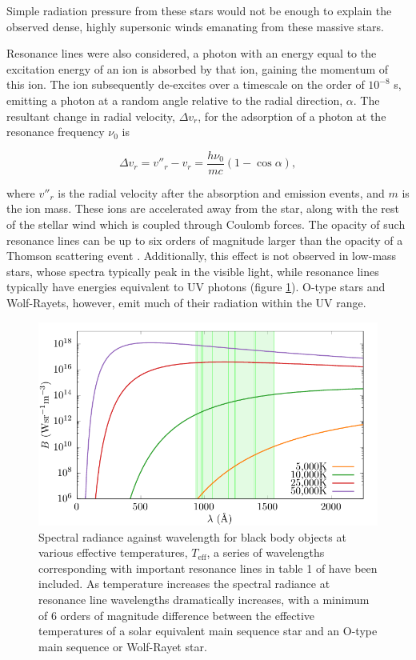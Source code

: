 Simple radiation pressure from these stars would not be enough to explain the observed dense, highly supersonic winds emanating from these massive stars.


Resonance lines were also considered, a photon with an energy equal to the excitation energy of an ion is absorbed by that ion, gaining the momentum of this ion.
The ion subsequently de-excites over a timescale on the order of $10^{-8}$ \si{\second}, emitting a photon at a random angle relative to the radial direction, $\alpha$. The resultant change in radial velocity, $\Delta v_r$, for the adsorption of a photon at the resonance frequency $\nu_0$ is

\begin{equation}
  \Delta v_r = v''_r - v_r = \frac{h\nu_0}{mc} (1-\cos\alpha),
\end{equation}

where $v''_r$ is the radial velocity after the absorption and emission events, and $m$ is the ion mass.
These ions are accelerated away from the star, along with the rest of the stellar wind which is coupled through Coulomb forces.
The opacity of such resonance lines can be up to six orders of magnitude larger than the opacity of a Thomson scattering event \parencite{lamersIntroductionStellarWinds1999}. Additionally, this effect is not observed in low-mass stars, whose spectra typically peak in the visible light, while resonance lines typically have energies equivalent to UV photons (figure \ref{fig:planck-comp}).
O-type stars and Wolf-Rayets, however, emit much of their radiation within the UV range.

\begin{figure}
  \centering
  \includegraphics{assets/plancks-law/plancks-law.pdf}
  \caption[Planck's law radiance comparison with resonance lines]{Spectral radiance against wavelength for black body objects at various effective temperatures, $T_{\text{eff}}$, a series of wavelengths corresponding with important resonance lines in table 1 of \cite{lucy_mass_1970} have been included. As temperature increases the spectral radiance at resonance line wavelengths dramatically increases, with a minimum of 6 orders of magnitude difference between the effective temperatures of a solar equivalent main sequence star and an O-type main sequence or Wolf-Rayet star.}
  \label{fig:planck-comp}
\end{figure}

